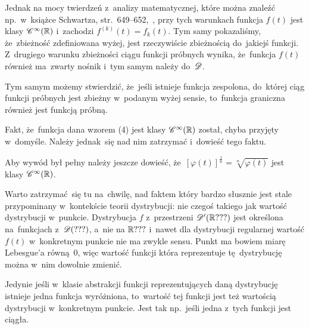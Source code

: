 \documentclass[a4paper,11pt]{article}
\begin{document}
Jednak na mocy twierdzeń z~analizy matematycznej, które można znaleźć
np.~w~książce Schwartza, str.~649--652,~\cite{SchwartzKursAnalizyMatematycznejVolI1979}, przy tych
warunkach funkcja $f( t )$ jest klasy $\mathcal{C}^{ \infty }( \mathbb{R} )$ i~zachodzi
$f^{ ( k ) }( t ) = f_{ k }( t )$. Tym samy pokazaliśmy, że~zbieżność
zdefiniowana wyżej, jest rzeczywiście zbieżnością do~jakiejś funkcji.
Z~drugiego warunku zbieżności ciągu funkcji próbnych wynika,
że~funkcja $f( t )$ również ma~zwarty nośnik i~tym samym należy
do~$\mathcal{D}$.

Tym samym możemy stwierdzić, że~jeśli istnieje funkcja zespolona,
do~której ciąg funkcji próbnych jest zbieżny w~podanym wyżej sensie,
to~funkcja graniczna również jest funkcją próbną.

\vspace{\spaceFour}





\start {} Fakt, że~funkcja dana wzorem (4) jest klasy
$\mathcal{C}^{ \infty }( \mathbb{R} )$ został, chyba przyjęty w~domyśle. Należy jednak~się
nad nim zatrzymać i~dowieść tego faktu. \Dok

\vspace{\spaceFour}





\start {} Aby wywód był pełny należy jeszcze dowieść,
że~$[ \varphi( t ) ]^{ \frac{ 1 }{ n } } = \sqrt[ n ]{ \varphi( t ) }$ jest
klasy $\mathcal{C}^{ \infty }( \mathbb{R} )$.

\vspace{\spaceFour}





\start {} Warto zatrzymać~się tu na~chwilę, nad faktem który
bardzo słusznie jest stale przypominany w~kontekście teorii
dystrybucji: nie czegoś takiego jak wartość dystrybucji w~punkcie.
Dystrybucja $f$ z~przestrzeni $\mathcal{D}'( \mathbb{R} ??? )$ jest określona
na~funkcjach z~$\mathcal{D}( ??? )$, a~nie na $\mathbb{R} ???$ i~nawet dla dystrybucji
regularnej wartość $f( t )$ w~konkretnym punkcie nie ma zwykle sensu.
Punkt ma bowiem miarę Lebesgue’a równą~0, więc wartość funkcji która
reprezentuje tę~dystrybucję można w~nim dowolnie zmienić.

Jedynie jeśli w~klasie abstrakcji funkcji reprezentujących daną
dystrybucję istnieje jedna funkcja wyróżniona, to~wartość tej funkcji
jest też wartością dystrybucji w~konkretnym punkcie. Jest tak
np.~jeśli jedna z~tych funkcji jest ciągła.
\end{document}
